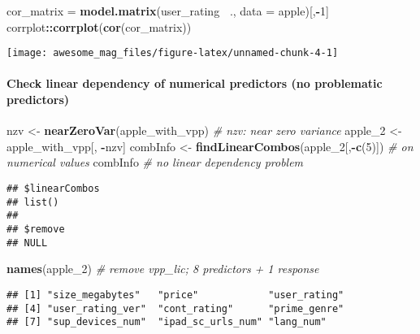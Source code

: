 \documentclass[]{article}
\newenvironment{Shaded}{\begin{snugshade}}{\end{snugshade}}
\newcommand{\KeywordTok}[1]{\textcolor[rgb]{0.13,0.29,0.53}{\textbf{#1}}}
\newcommand{\DataTypeTok}[1]{\textcolor[rgb]{0.13,0.29,0.53}{#1}}
\newcommand{\DecValTok}[1]{\textcolor[rgb]{0.00,0.00,0.81}{#1}}
\newcommand{\StringTok}[1]{\textcolor[rgb]{0.31,0.60,0.02}{#1}}
\newcommand{\CommentTok}[1]{\textcolor[rgb]{0.56,0.35,0.01}{\textit{#1}}}
\newcommand{\OperatorTok}[1]{\textcolor[rgb]{0.81,0.36,0.00}{\textbf{#1}}}
\newcommand{\NormalTok}[1]{#1}
\let\oldparagraph\paragraph
\renewcommand{\paragraph}[1]{\oldparagraph{#1}\mbox{}}
\begin{document}
\begin{Shaded}
\begin{Highlighting}[]
\NormalTok{cor_matrix =}\StringTok{ }\KeywordTok{model.matrix}\NormalTok{(user_rating }\OperatorTok{~}\NormalTok{., }\DataTypeTok{data =}\NormalTok{ apple)[,}\OperatorTok{-}\DecValTok{1}\NormalTok{]}
\NormalTok{corrplot}\OperatorTok{::}\KeywordTok{corrplot}\NormalTok{(}\KeywordTok{cor}\NormalTok{(cor_matrix))}
\end{Highlighting}
\end{Shaded}

\texttt{[image: awesome\_mag\_files/figure-latex/unnamed-chunk-4-1]}

\paragraph{Check linear dependency of numerical predictors (no
problematic
predictors)}\label{check-linear-dependency-of-numerical-predictors-no-problematic-predictors}

\begin{Shaded}
\begin{Highlighting}[]
\NormalTok{nzv <-}\StringTok{ }\KeywordTok{nearZeroVar}\NormalTok{(apple_with_vpp) }\CommentTok{# nzv: near zero variance}
\NormalTok{apple_}\DecValTok{2}\NormalTok{ <-}\StringTok{ }\NormalTok{apple_with_vpp[, }\OperatorTok{-}\NormalTok{nzv]}
\NormalTok{combInfo <-}\StringTok{ }\KeywordTok{findLinearCombos}\NormalTok{(apple_}\DecValTok{2}\NormalTok{[,}\OperatorTok{-}\KeywordTok{c}\NormalTok{(}\DecValTok{5}\NormalTok{)]) }\CommentTok{# on numerical values}
\NormalTok{combInfo }\CommentTok{# no linear dependency problem}
\end{Highlighting}
\end{Shaded}

\begin{verbatim}
## $linearCombos
## list()
## 
## $remove
## NULL
\end{verbatim}

\begin{Shaded}
\begin{Highlighting}[]
\KeywordTok{names}\NormalTok{(apple_}\DecValTok{2}\NormalTok{) }\CommentTok{# remove vpp_lic; 8 predictors + 1 response}
\end{Highlighting}
\end{Shaded}

\begin{verbatim}
## [1] "size_megabytes"   "price"            "user_rating"     
## [4] "user_rating_ver"  "cont_rating"      "prime_genre"     
## [7] "sup_devices_num"  "ipad_sc_urls_num" "lang_num"
\end{verbatim}
\end{document}
